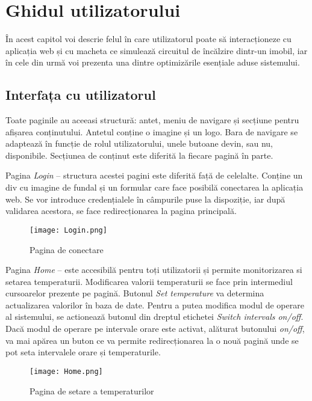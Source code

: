 \chapter{Ghidul utilizatorului}\label{ch:5interfataUtilizator}

	În acest capitol voi descrie felul în care utilizatorul poate să interacționeze cu aplicația web și cu macheta ce simulează circuitul de încălzire dintr-un imobil, iar în cele din urmă voi prezenta una dintre optimizările esențiale aduse sistemului.

\section{Interfața cu utilizatorul}

	Toate paginile au aceeasi structură: antet, meniu de navigare și secțiune pentru afișarea conținutului.
	Antetul conține o imagine și un logo.
	Bara de navigare se adaptează în funcție de rolul utilizatorului, unele butoane devin, sau nu, disponibile.
	Secțiunea de conținut este diferită la fiecare pagină în parte.
	
\vspace{0.5em}

	Pagina \textit{Login} – structura acestei pagini este diferită față de celelalte. Conține un div cu imagine de fundal și un formular care face posibilă conectarea la aplicația web. Se vor introduce credențialele în câmpurile puse la dispoziție, iar după validarea acestora, se face redirecționarea la pagina principală.

\begin{figure}[H]
   	\centering
    	\texttt{[image: Login.png]}
	\caption{Pagina de conectare}
\end{figure}

	Pagina \textit{Home} – este accesibilă pentru toți utilizatorii și permite monitorizarea si setarea temperaturii. Modificarea valorii temperaturii se face prin intermediul cursoarelor prezente pe pagină. Butonul \textit{Set temperature} va determina actualizarea valorilor în baza de date. Pentru a putea modifica modul de operare al sistemului, se actionează butonul din dreptul etichetei \textit{Switch intervals on/off}. Dacă modul de operare pe intervale orare este activat, alăturat butonului \textit{on/off}, va mai apărea un buton ce va permite redirecționarea la o nouă pagină unde se pot seta intervalele orare și temperaturile.

\begin{figure}[H]
   	\centering
    	\texttt{[image: Home.png]}
	\caption{Pagina de setare a temperaturilor}
\end{figure}


